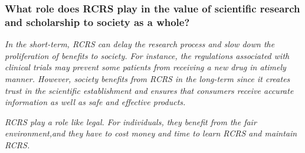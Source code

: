 \documentclass{beamer}
\begin{document}
\begin{frame}

\frametitle{What role does RCRS play in the value of scientific research and scholarship to society as a whole?}


{\it In the short-term, RCRS can delay the research process and slow down the proliferation of benefits to society.  For instance, the regulations associated with clinical trials may prevent some patients from receiving a new drug in atimely manner. However, society benefits from RCRS in the long-term since it creates trust in the scientific establishment and ensures that consumers receive accurate information as well as safe and effective products.}

{\it RCRS play a role like legal.  For individuals, they benefit from the fair environment,and they have to cost money and time to learn RCRS and maintain RCRS.}




  








\end{frame} 
\end{document}
